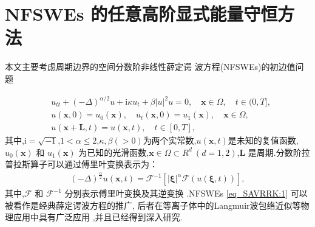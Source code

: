 \chapter[NFSWEs 的任意高阶显式能量守恒方法]{NFSWEs 的任意高阶显式能量守恒方法
}

本文主要考虑周期边界的空间分数阶非线性薛定谔 波方程(NFSWEs)的初边值问题

\begin{align}
&  u_{t t}+(-\Delta)^{\alpha / 2} u+\mathrm{i} \kappa u_{t}+\beta|u|^{2} u=0, \quad \boldsymbol{x} \in \Omega, \quad  t \in(0, T],\label{eq_SAVRRK:1}\\
& u(\boldsymbol{x}, 0)=u_{0}(\boldsymbol{x}), \quad u_{t}(\boldsymbol{x}, 0)=u_{1}(\boldsymbol{x}),\quad \boldsymbol{x} \in \Omega, \label{eq_SAVRRK:2}\\
& u(\boldsymbol{x}+\boldsymbol{L}, t)=u(\boldsymbol{x}, t), \quad t \in[0, T],\label{eq_SAVRRK:3}
\end{align}
其中,$\mathrm{i}=\sqrt{-1}$,$1<\alpha \leq 2$,$\kappa, \beta(>0)$为两个实常数,$u(\boldsymbol{x}, t)$是未知的复值函数,$u_{0}(\boldsymbol{x})$ 和 $u_{1}(\boldsymbol{x})$ 为已知的光滑函数,$\boldsymbol{x}\in\Omega\!\subset\!
R^d~(d\!=\!1,2)$,$\boldsymbol{L}$ 是周期.分数阶拉普拉斯算子可以通过傅里叶变换表示为：
\begin{align}\label{eq_SAVRRK:4}
(-\Delta)^{\frac{\alpha}{2}} u(\boldsymbol{x},t)=\mathcal{F}^{-1}\left[|\boldsymbol{\xi}|^{\alpha} \mathcal{F}(u(\boldsymbol{\xi},t))\right],
\end{align}
其中,$\mathcal{F}$ 和 $\mathcal{F}^{-1}$ 分别表示傅里叶变换及其逆变换 \cite{caffarelliExtensionProblemRelated2007}.NFSWEs \eqref{eq_SAVRRK:1} 可以被看作是经典薛定谔波方程的推广,
后者在等离子体中的Langmuir波包络近似等物理应用中具有广泛应用 \cite{colinSemidiscretizationTimeNonlinear1998},并且已经得到深入研究\cite{zhangConservativeNumericalScheme2003,baoUniformErrorEstimates2012,chengSeveralConservativeCompact2018,brugnanoClassEnergyconservingHamiltonian2018}.


